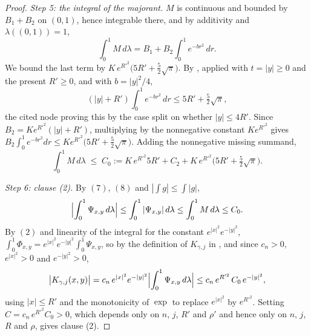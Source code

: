 \begin{proof}
\emph{Step 5: the integral of the majorant.}
$M$ is continuous and bounded by $B_1+B_2$ on $(0,1)$, hence integrable there, and by
additivity and $\lambda((0,1)) = 1$,
\[
  \int_0^1 M \,d\lambda = B_1 + B_2\int_0^1 e^{-br^2}\,dr .
\]
We bound the last term by $K\,e^{R'^2}\bigl(5R' + \tfrac52\sqrt\pi\bigr)$.  By
, applied with $t = |y| \geq 0$ and
the present $R' \geq 0$, and with $b = |y|^2/4$,
\[
  (|y|+R')\int_0^1e^{-br^2}\,dr \leq 5R' + \tfrac52\sqrt\pi ,
\]
the cited node proving this by the case split on whether $|y| \leq 4R'$.  Since
$B_2 = Ke^{R'^2}(|y|+R')$, multiplying by the nonnegative constant $Ke^{R'^2}$ gives
$B_2\int_0^1e^{-br^2}dr \leq Ke^{R'^2}\bigl(5R'+\tfrac52\sqrt\pi\bigr)$.  Adding the
nonnegative missing summand,
\begin{equation*}
  \int_0^1 M\,d\lambda \;\leq\; C_0
    := K\,e^{R'^2}5R' + C_2 + K\,e^{R'^2}\bigl(5R' + \tfrac52\sqrt\pi\bigr) . \tag{8}
\end{equation*}

\emph{Step 6: clause (2).}
By $(7)$, $(8)$ and $|\int g| \leq \int|g|$,
\[
  \Bigl|\int_0^1 \Psi_{x,y}\,d\lambda\Bigr|
    \leq \int_0^1|\Psi_{x,y}|\,d\lambda
    \leq \int_0^1 M\,d\lambda \leq C_0 .
\]
By $(2)$ and linearity of the integral for the constant $e^{|x|^2}e^{-|y|^2}$,
$\int_0^1\Phi_{x,y} = e^{|x|^2}e^{-|y|^2}\int_0^1\Psi_{x,y}$, so by the definition of
$K_{\gamma,j}$ in , and since $c_n > 0$, $e^{|x|^2} > 0$ and
$e^{-|y|^2} > 0$,
\[
  \bigl|K_{\gamma,j}(x,y)\bigr|
    = c_n\,e^{|x|^2}e^{-|y|^2}\Bigl|\int_0^1\Psi_{x,y}\,d\lambda\Bigr|
    \leq c_n\,e^{R'^2}\,C_0\,e^{-|y|^2} ,
\]
using $|x| \leq R'$ and the monotonicity of $\exp$ to replace $e^{|x|^2}$ by $e^{R'^2}$.
Setting $C = c_n\,e^{R'^2}C_0 > 0$, which depends only on $n$, $j$, $R'$ and $\rho'$ and
hence only on $n$, $j$, $R$ and $\rho$, gives clause (2).
\end{proof}

